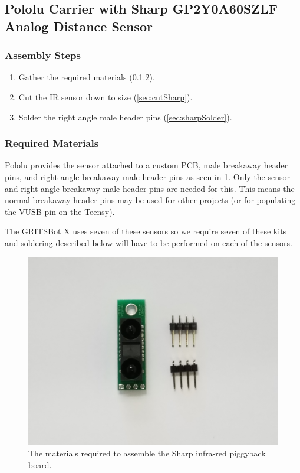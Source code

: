 \subsection{Pololu Carrier with Sharp GP2Y0A60SZLF Analog Distance Sensor}

 \subsubsection{Assembly Steps}
 
 \begin{enumerate}
 \item Gather the required materials (\cref{sec:sharpMaterials}).
 \item Cut the IR sensor down to size (\cref{sec:cutSharp}).
 \item Solder the right angle male header pins (\cref{sec:sharpSolder}).
 \end{enumerate}
 
 \subsubsection{Required Materials}
 \label{sec:sharpMaterials}
 
 Pololu provides the sensor attached to a custom PCB, male breakaway header pins, and right angle breakaway male header pins as seen in \cref{fig:sharpMaterials}. Only the sensor and right angle breakaway male header pins are needed for this. This means the normal breakaway header pins may be used for other projects (or for populating the VUSB pin on the Teensy).
 
 The GRITSBot X uses seven of these sensors so we require seven of these kits and soldering described below will have to be performed on each of the sensors.
 
\begin{figure}[h!]
\centering
\includegraphics[width=0.65\columnwidth, keepaspectratio]{./figs/20181121_110942.jpg}
\caption{The materials required to assemble the Sharp infra-red piggyback board.}
\label{fig:sharpMaterials}
\end{figure}

